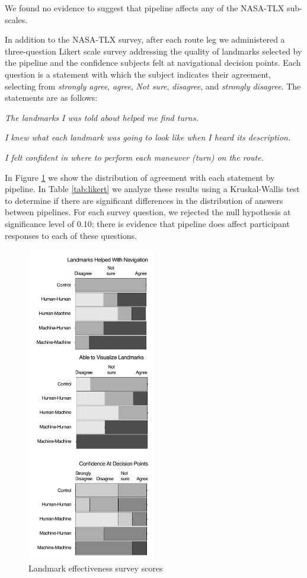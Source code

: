 We found no evidence to suggest that pipeline affects any of the NASA-TLX sub-scales.

In addition to the NASA-TLX survey, after each route leg we administered a three-question Likert scale survey addressing the quality of landmarks selected by the pipeline and the confidence subjects felt at navigational decision points. Each question is a statement with which the subject indicates their agreement, selecting from \textit{strongly agree}, \textit{agree}, \textit{Not sure}, \textit{disagree}, and  \textit{strongly disagree}. The statements are as follows:

\textit{The landmarks I was told about helped me find turns.}

\textit{I knew what each landmark was going to look like when I heard its description.}

\textit{I felt confident in where to perform each maneuver (turn) on the route.}

In Figure \ref{fig:plot:likert} we show the distribution of agreement with each statement by pipeline. In Table \ref{tab:likert} we analyze these results using a Kruskal-Wallis test to determine if there are significant differences in the distribution of answers between pipelines. For each survey question, we rejected the null hypothesis at significance level of 0.10; there is evidence that pipeline does affect participant responses to each of these questions. 

\begin{figure}[htbp]
  \centering
  \includegraphics[width=0.5\textwidth]{images/plot_likert.pdf}
  \caption{Landmark effectiveness survey scores}
  \label{fig:plot:likert}
\end{figure}

